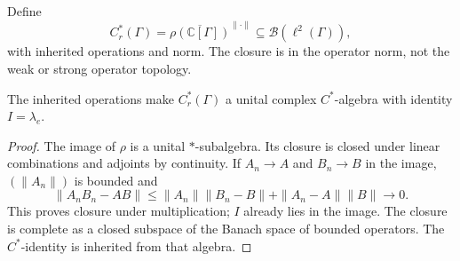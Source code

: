 \begin{definition}\label{def:reduced-group-cstar}
\leanok
{}
Define
\[
 C_r^*(\Gamma)=\overline{\rho(\mathbb C[\Gamma])}^{\|\cdot\|}
 \subseteq\mathcal B(\ell^2(\Gamma)),
\]
with inherited operations and norm. The closure is in the operator norm,
not the weak or strong operator topology.
\end{definition}

\begin{proposition}\label{prop:reduced-group-cstar-structure}
\leanok
{}
The inherited operations make $C_r^*(\Gamma)$ a unital complex
$C^*$-algebra with identity $I=\lambda_e$.
\end{proposition}
\begin{proof}
\leanok
The image of $\rho$ is a unital $*$-subalgebra. Its closure is closed under
linear combinations and adjoints by continuity.
If $A_n\to A$ and $B_n\to B$ in the image, $(\|A_n\|)$ is bounded and
\[
 \|A_nB_n-AB\|\leq\|A_n\|\|B_n-B\|+\|A_n-A\|\|B\|\longrightarrow0.
\]
This proves closure under multiplication; $I$ already lies in the image.
The closure is complete as a closed subspace of the Banach space of
bounded operators. The $C^*$-identity is inherited from that algebra.
\end{proof}

